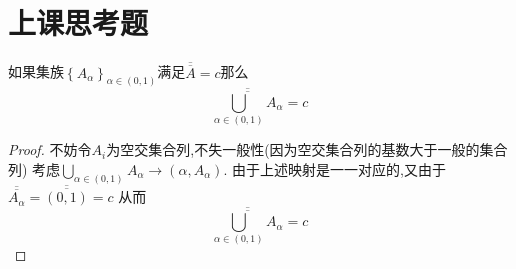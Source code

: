 \section{上课思考题}
如果集族\(\left\{A_{\alpha}\right\}_{\alpha \in (0,1)}\)满足\(\overline{\overline{A}}=c\)那么\[\overline{\overline{\bigcup\limits_{\alpha\in (0,1)}A_{\alpha}}}=c\]
\begin{proof}
    不妨令\(A_i\)为空交集合列,不失一般性(因为空交集合列的基数大于一般的集合列)
    考虑\(\bigcup\limits_{\alpha \in (0,1)}A_{\alpha} \rightarrow (\alpha , A_{\alpha})\).
    由于上述映射是一一对应的,又由于\(\overline{\overline{A_{\alpha}}}=\overline{\overline{(0,1)}} = c\)
    从而\[\overline{\overline{\bigcup\limits_{\alpha \in (0,1)}A_{\alpha}}} = c \]
\end{proof}